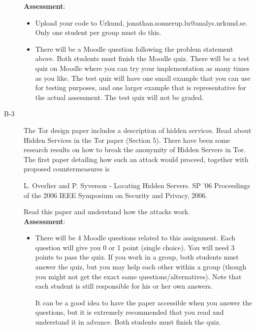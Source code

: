 \documentclass{article}
\begin{document}
\begin{description}
{		\textbf{Assessment}:
	\begin{itemize}
		\item Upload your code to Urkund, jonathan.sonnerup.lu@analys.urkund.se.  Only one student per group must do this.
		\item There will be a Moodle question following the problem statement above. Both students must finish the Moodle quiz. There will be	a test quiz on Moodle where you can try your implementation as many times as you like. The test quiz will have one small example that you can use for testing purposes, and one larger example that is representative for the actual assessment. The test quiz will not be graded.
	\end{itemize}
	}
	

	\item[B-3]{The Tor design paper includes a description of hidden services. Read about Hidden Services in the Tor paper (Section 5). 
		There have been some research results on how to break the anonymity of Hidden Servers in Tor. The first paper detailing how such an attack would proceed, together with proposed countermeasures is 
		\begin{center}
			\begin{minipage}{0.8\textwidth}
				L. Overlier and P. Syverson - Locating Hidden Servers. SP '06 Proceedings of the 2006 IEEE Symposium on Security and Privacy, 2006.
			\end{minipage}
		\end{center}
		Read this paper and understand how the attacks work.\\
	\textbf{Assessment}:
	\begin{itemize}
		\item There will be 4 Moodle questions related to this assignment. Each question will give you 0 or 1 point (single choice). You will need 3 points to pass the quiz.	If you work in a group, both students must answer the quiz, but you may help each other within a group (though you might not get the exact same questions/alternatives). Note that each student is still responsible for his or her own answers. 
		 
		It can be a good idea to have the paper accessible when you answer the questions, but it is extremely recommended that you read and understand it in advance. Both students must finish the quiz.
	\end{itemize}
	}	

	
	
\end{description}
\end{document}
